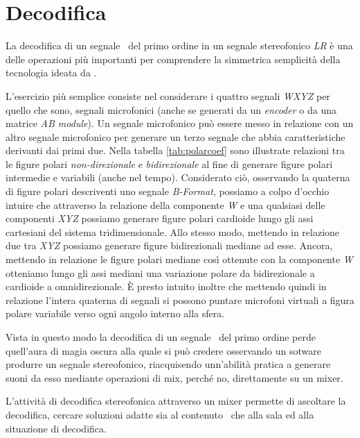 \section{Decodifica}

La decodifica di un segnale \amb~del primo ordine in un segnale stereofonico
\emph{LR} è una delle operazioni più importanti per comprendere la simmetrica
semplicità della tecnologia ideata da \mg.

L'esercizio più semplice consiste nel considerare i quattro segnali \emph{WXYZ}
per quello che sono, segnali microfonici (anche se generati da un \emph{encoder}
o da una matrice \emph{AB module}). Un segnale microfonico può essere messo in
relazione con un altro segnale microfonico per generare un terzo segnale che
abbia caratteristiche derivanti dai primi due. Nella tabella \ref{tab:polarcoef}
sono illustrate relazioni tra le figure polari \emph{non-direzionale} e
\emph{bidirezionale} al fine di generare figure polari intermedie e variabili
(anche nel tempo). Considerato ciò, osservando la quaterna di figure polari
descriventi uno segnale \emph{B-Format}, possiamo a colpo d'occhio intuire che
attraverso la relazione della componente \emph{W} e una qualsiasi delle
componenti \emph{XYZ} possiamo generare figure polari cardioide lungo gli assi
cartesiani del sistema tridimensionale. Allo stesso modo, mettendo in relazione
due tra \emph{XYZ} possiamo generare figure bidirezionali mediane ad esse. Ancora,
mettendo in relazione le figure polari mediane così ottenute con la componente
\emph{W} otteniamo lungo gli assi mediani una variazione polare da bidirezionale
a cardioide a omnidirezionale. È presto intuito inoltre che mettendo quindi in
relazione l'intera quaterna di segnali si possono puntare microfoni virtuali
a figura polare variabile verso ogni angolo interno alla sfera.

Vista in questo modo la decodifica di un segnale \amb~del primo ordine perde
quell'aura di magia oscura alla quale si può credere osservando un sotware
produrre un segnale stereofonico, riacquisendo unn'abilità pratica a generare
suoni da esso mediante operazioni di mix, perché no, direttamente su un mixer.

L'attività di decodifica stereofonica attraverso un mixer permette di ascoltare
la decodifica, cercare soluzioni adatte sia al contenuto \amb~che alla sala ed
alla situazione di decodifica.
